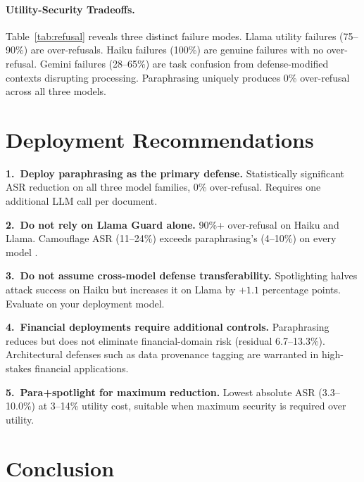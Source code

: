 \documentclass[11pt]{article}
\begin{document}
\paragraph{Utility-Security Tradeoffs.}
Table~\ref{tab:refusal} reveals three distinct failure modes.
Llama utility failures (75--90\%) are over-refusals. Haiku failures
(100\%) are genuine failures with no over-refusal. Gemini failures
(28--65\%) are task confusion from defense-modified contexts disrupting
processing. Paraphrasing uniquely produces 0\% over-refusal across all
three models.

\section{Deployment Recommendations}

\textbf{1.~Deploy paraphrasing as the primary defense.}
Statistically significant ASR reduction on all three model families,
0\% over-refusal. Requires one additional LLM call per document.

\textbf{2.~Do not rely on Llama Guard alone.}
90\%+ over-refusal on Haiku and Llama. Camouflage ASR (11--24\%)
exceeds paraphrasing's (4--10\%) on every model
\citep{meta2024llamaguard3,inan2023llama}.

\textbf{3.~Do not assume cross-model defense transferability.}
Spotlighting halves attack success on Haiku but increases it on
Llama by $+1.1$ percentage points. Evaluate on your deployment model.

\textbf{4.~Financial deployments require additional controls.}
Paraphrasing reduces but does not eliminate financial-domain risk
(residual 6.7--13.3\%). Architectural defenses such as data provenance
tagging \citep{wallace2024instruction} are warranted in high-stakes
financial applications.

\textbf{5.~Para+spotlight for maximum reduction.}
Lowest absolute ASR (3.3--10.0\%) at 3--14\% utility cost, suitable
when maximum security is required over utility.

\section{Conclusion}
\end{document}
